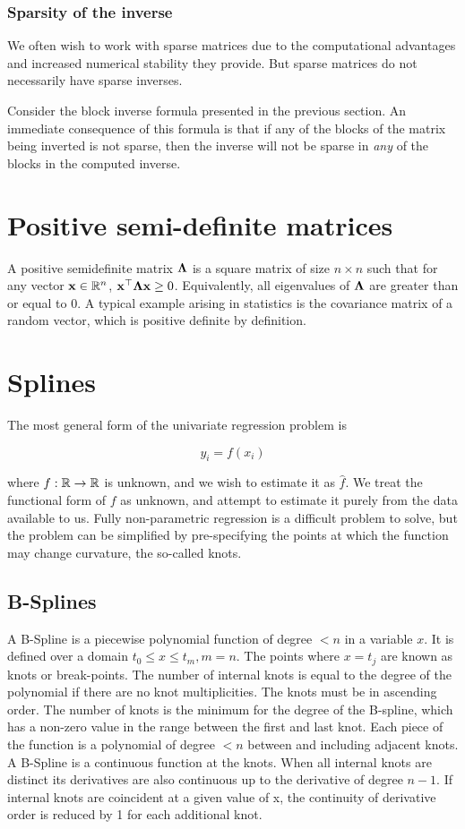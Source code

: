 \documentclass{amsart}[12pt]
\begin{document}
\subsubsection{Sparsity of the inverse}
We often wish to work with sparse matrices due to the computational advantages and increased numerical
stability they provide. But sparse matrices do not necessarily have sparse inverses. 

Consider the block inverse formula presented in the previous section. An immediate consequence of this formula
is that if any of the blocks of the matrix being inverted is not sparse, then the inverse will not be sparse
in \emph{any} of the blocks in the computed inverse.

\section{Positive semi-definite matrices}
A positive semidefinite matrix ${\boldsymbol \Lambda}$ is a square matrix of size $n \times n$ such that for any vector
${\bf x} \in {\mathbb{R}}^n$, ${\bf x}^\top {\boldsymbol\Lambda} {\bf x} \geq 0$. Equivalently, all eigenvalues of ${\boldsymbol \Lambda}$ are greater than or 
equal to 0. A typical example arising in statistics is the covariance matrix of a random vector, which is
positive definite by definition.

\section{Splines}
The most general form of the univariate regression problem is

\[
	y_i = f(x_i)
\]

where $f: {\mathbb{R}} \to {\mathbb{R}}$ is unknown, and we wish to estimate it as $\hat{f}$. We treat the functional form of
$f$ as unknown, and attempt to estimate it purely from the data available to us. Fully non-parametric regression
is a difficult problem to solve, but the problem can be simplified by pre-specifying the points at which the
function may change curvature, the so-called knots.

\subsection{B-Splines}
A B-Spline is a piecewise polynomial function of degree $< n$ in a variable $x$. It is defined over a
domain $t_0 \leq x \leq t_m, m=n$. The points where $x = t_j$ are known as knots or break-points. The
number of internal knots is equal to the degree of the polynomial if there are no knot multiplicities.
The knots must be in ascending order. The number of knots is the minimum for the degree of the B-spline,
which has a non-zero value in the range between the first and last knot. Each piece of the function is a
polynomial of degree $< n$ between and including adjacent knots. A B-Spline is a continuous function at the
knots. When all internal knots are distinct its derivatives are also continuous up to the derivative of degree
$n - 1$. If internal knots are coincident at a given value of x, the continuity of derivative order is reduced
by 1 for each additional knot.
\end{document}
